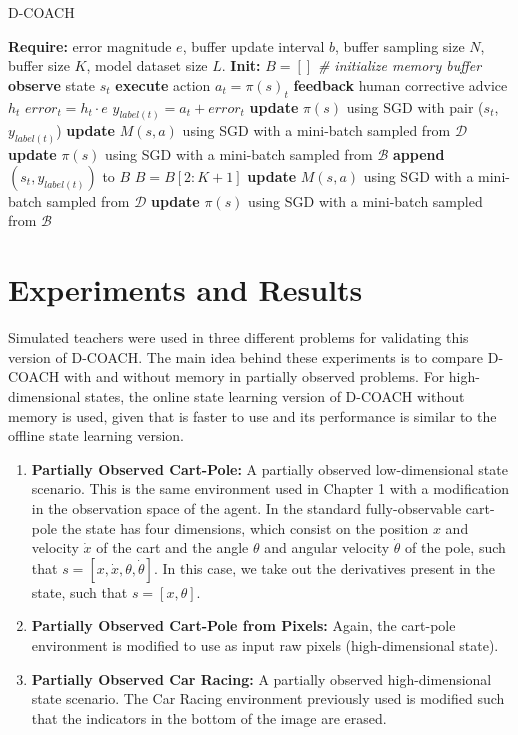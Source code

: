 \begin{algorithm}[h]
\caption{D-COACH }\label{algorithm:DeepCOACH-M}
\begin{algorithmic}[1]
\State \textbf{Require:} error magnitude $e$, buffer update interval $b$, buffer sampling size $N$, buffer size $K$, model dataset size $L$.
\State \textbf{Init:} $B = []$  \emph{\# initialize memory buffer}
\State \textbf{observe} state $s_{t}$
\State \textbf{execute} action $a_{t}=\pi(s)_{t}$
\State \textbf{feedback} human corrective advice $h_{t}$
\State $\mathit{error}_{t} = h_{t}\cdot e$
\State $y_{label(t)} = a_{t} + \mathit{error}_{t}$ 
\State \textbf{update} $\pi(s)$ using SGD with pair ($s_{t}$, $y_{\mathit{label}(t)}$) 
\State \textbf{update} $M(s,a)$ using SGD with a mini-batch sampled from $\mathcal{D}$
\State \textbf{update} $\pi(s)$ using SGD with a mini-batch sampled from $\mathcal{B}$
\State \textbf{append} $(s_{t}, y_{\mathit{label}(t)})$ to $B$
\State $B = B[2:K+1]$
\EndIf
\EndIf
{}
\State \textbf{update} $M(s,a)$ using SGD with a mini-batch sampled from $\mathcal{D}$
\State \textbf{update} $\pi(s)$ using SGD with a mini-batch sampled from $\mathcal{B}$
\EndIf
\EndFor
\end{algorithmic}
\end{algorithm}


\section{Experiments and Results}
Simulated teachers were used in three different problems for validating this version of D-COACH. The main idea behind these experiments is to compare D-COACH with and without memory in partially observed problems. For high-dimensional states, the online state learning version of D-COACH without memory is used, given that is faster to use and its performance is similar to the offline state learning version. 

\begin{enumerate}
    \item \textbf{Partially Observed Cart-Pole:} A partially observed low-dimensional state scenario. This is the same environment used in Chapter 1 with a modification in the observation space of the agent. In the standard fully-observable cart-pole the state has four dimensions, which consist on the position $x$ and velocity $\dot x$ of the cart and the angle $\theta$ and angular velocity $\dot \theta$ of the pole, such that $s=[x, \dot x, \theta, \dot \theta]$. In this case, we take out the derivatives present in the state, such that $s=[x, \theta]$.
    \item \textbf{Partially Observed Cart-Pole from Pixels:} Again, the cart-pole environment is modified to use as input raw pixels (high-dimensional state). 
    \item \textbf{Partially Observed Car Racing:} A partially observed high-dimensional state scenario. The Car Racing environment previously used is modified such that the indicators in the bottom of the image are erased. 
    
\end{enumerate}

